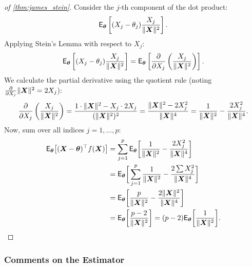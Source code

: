 \begin{proof}[of \autoref{thm:james_stein}]
Consider the $j$-th component of the dot product:
\[
\mathsf{E}_{\boldsymbol{\theta}}\left[(X_j - \theta_j) \frac{X_j}{\|\boldsymbol{X}\|^2}\right].
\]
Applying Stein's Lemma with respect to $X_j$:
\[
\mathsf{E}_{\boldsymbol{\theta}} \left[ (X_j - \theta_j) \frac{X_j}{\|\boldsymbol{X}\|^2} \right] = \mathsf{E}_{\boldsymbol{\theta}} \left[ \frac{\partial}{\partial X_j} \left( \frac{X_j}{\|\boldsymbol{X}\|^2} \right) \right].
\]
We calculate the partial derivative using the quotient rule (noting $\frac{\partial}{\partial X_j} \|\boldsymbol{X}\|^2 = 2X_j$):
\[
\frac{\partial}{\partial X_j} \left( \frac{X_j}{\|\boldsymbol{X}\|^2} \right) = \frac{1 \cdot \|\boldsymbol{X}\|^2 - X_j \cdot 2X_j}{(\|\boldsymbol{X}\|^2)^2} = \frac{\|\boldsymbol{X}\|^2 - 2X_j^2}{\|\boldsymbol{X}\|^4} = \frac{1}{\|\boldsymbol{X}\|^2} - \frac{2X_j^2}{\|\boldsymbol{X}\|^4}.
\]
Now, sum over all indices \(j=1, \dots, p\):
\begin{align*}
\mathsf{E}_{\boldsymbol{\theta}}\big[(\boldsymbol{X} - \boldsymbol{\theta})^{\top} f(\boldsymbol{X})\big] &= \sum_{j=1}^{p} \mathsf{E}_{\boldsymbol{\theta}}\bigg[\frac{1}{\|\boldsymbol{X}\|^2} - \frac{2X_j^2}{\|\boldsymbol{X}\|^4} \bigg] \\
&= \mathsf{E}_{\boldsymbol{\theta}} \bigg[ \sum_{j=1}^p \frac{1}{\|\boldsymbol{X}\|^2} - \frac{2 \sum X_j^2}{\|\boldsymbol{X}\|^4} \bigg] \\
&= \mathsf{E}_{\boldsymbol{\theta}} \bigg[ \frac{p}{\|\boldsymbol{X}\|^2} - \frac{2 \|\boldsymbol{X}\|^2}{\|\boldsymbol{X}\|^4} \bigg] \\
&= \mathsf{E}_{\boldsymbol{\theta}} \bigg[ \frac{p - 2}{\|\boldsymbol{X}\|^2} \bigg] = (p-2) \mathsf{E}_{\boldsymbol{\theta}} \bigg[ \frac{1}{\|\boldsymbol{X}\|^2} \bigg].
\end{align*}
\end{proof}

\subsubsection{Comments on the Estimator}

